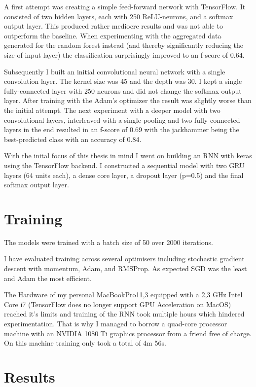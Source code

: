 A first attempt was creating a simple feed-forward network with TensorFlow. It consisted of two hidden layers, each with 250 ReLU-neurons, and a softmax output layer. This produced rather mediocre results and was not able to outperform the baseline. When experimenting with the aggregated data generated for the random forest instead (and thereby significantly reducing the size of input layer) the classification surprisingly improved to an f-score of 0.64.


Subsequently I built an initial convolutional neural network with a single convolution layer.  The kernel size was 45 and the depth was 30. I kept a single fully-connected layer with 250 neurons and did not change the softmax output layer. After training with the Adam's optimizer the result was slightly worse than the initial attempt. The next experiment with a deeper model with two convolutional layers, interleaved with a single pooling and two fully connected layers in the end resulted in an f-score of 0.69 with the jackhammer being the best-predicted class with an accuracy of 0.84. 

With the inital focus of this thesis in mind I went on building an RNN with keras using the TensorFlow backend. I constructed a sequential model with two GRU layers (64 units each), a dense core layer, a dropout layer (p=0.5) and the final softmax output layer.

\section{Training}

The models were trained with a batch size of 50 over 2000 iterations.

I have evaluated training across several optimisers including stochastic gradient descent with momentum, Adam, and RMSProp. As expected SGD was the least and Adam the most efficient.

The Hardware of my personal MacBookPro11,3 equipped with a 2,3 GHz Intel Core i7 (TensorFlow does no longer support GPU Acceleration on MacOS) reached it's limits and training of the RNN took multiple hours which hindered experimentation. That is why I managed to borrow a quad-core processor machine with an NVIDIA 1080 Ti graphics processor from a friend free of charge. On this machine training only took a total of 4m 56s.


\section{Results}

